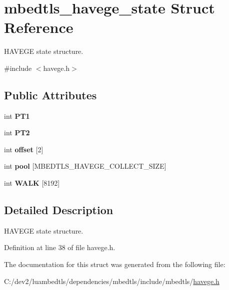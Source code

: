 \hypertarget{structmbedtls__havege__state}{\section{mbedtls\-\_\-havege\-\_\-state Struct Reference}
\label{structmbedtls__havege__state}
}


H\-A\-V\-E\-G\-E state structure.  




{\ttfamily \#include $<$havege.\-h$>$}

\subsection*{Public Attributes}
\begin{DoxyCompactItemize}
\item 
\hypertarget{structmbedtls__havege__state_adac07bcb4556e5831b0a1345fb4484ea}{int {\bfseries P\-T1}}\label{structmbedtls__havege__state_adac07bcb4556e5831b0a1345fb4484ea}

\item 
\hypertarget{structmbedtls__havege__state_ae0f660e103c23be2036ad0831052da2d}{int {\bfseries P\-T2}}\label{structmbedtls__havege__state_ae0f660e103c23be2036ad0831052da2d}

\item 
\hypertarget{structmbedtls__havege__state_a5e52d25e8ccf40df7069abdc5d8ac522}{int {\bfseries offset} \mbox{[}2\mbox{]}}\label{structmbedtls__havege__state_a5e52d25e8ccf40df7069abdc5d8ac522}

\item 
\hypertarget{structmbedtls__havege__state_a4abcd9c2f5e3dd42e264dfffdc2f17d9}{int {\bfseries pool} \mbox{[}M\-B\-E\-D\-T\-L\-S\-\_\-\-H\-A\-V\-E\-G\-E\-\_\-\-C\-O\-L\-L\-E\-C\-T\-\_\-\-S\-I\-Z\-E\mbox{]}}\label{structmbedtls__havege__state_a4abcd9c2f5e3dd42e264dfffdc2f17d9}

\item 
\hypertarget{structmbedtls__havege__state_a14de6a4b46e53b88f36c82069042a99e}{int {\bfseries W\-A\-L\-K} \mbox{[}8192\mbox{]}}\label{structmbedtls__havege__state_a14de6a4b46e53b88f36c82069042a99e}

\end{DoxyCompactItemize}


\subsection{Detailed Description}
H\-A\-V\-E\-G\-E state structure. 

Definition at line 38 of file havege.\-h.



The documentation for this struct was generated from the following file\-:\begin{DoxyCompactItemize}
\item 
C\-:/dev2/luambedtls/dependencies/mbedtls/include/mbedtls/\hyperlink{havege_8h}{havege.\-h}\end{DoxyCompactItemize}
